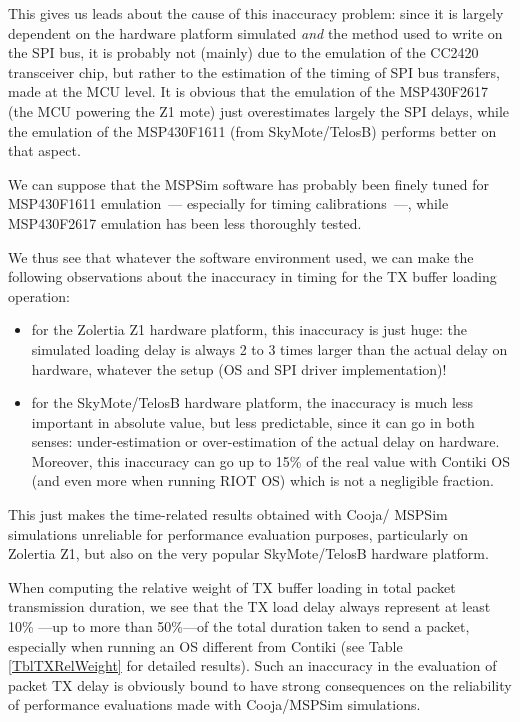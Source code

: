 \documentclass[10pt]{ewsn-proc}
\begin{document}
\medskip

This gives us leads about the cause of this inaccuracy problem: since it
is largely dependent on the hardware platform simulated \emph{and} the method
used to write on the SPI bus, it is probably not (mainly) due to the
emulation of the CC2420 transceiver chip, but rather to the estimation of
the timing of SPI bus transfers, made at the MCU level. It is obvious that
the emulation of the MSP430F2617 (the MCU powering the Z1 mote) just
overestimates largely the SPI delays, while the emulation of the MSP430F1611
(from SkyMote/TelosB) performs better on that aspect.

We can suppose that the MSPSim software has probably been finely tuned for
MSP430F1611 emulation~--- especially for timing calibrations~---, while
MSP430F2617 emulation has been less thoroughly tested.

\medskip

We thus see that whatever the software environment used, we can make the
following observations about the inaccuracy in timing for the TX buffer
loading operation:
\begin{itemize}
\item for the Zolertia Z1 hardware platform, this inaccuracy is just huge:
the simulated loading delay is always 2 to 3 times larger than the actual
delay on hardware, whatever the setup (OS and SPI driver implementation)!
\item for the SkyMote/TelosB hardware platform, the inaccuracy is much less
important in absolute value, but less predictable, since it can go in both
senses: under-estimation or over-estimation of the actual delay on hardware.
Moreover, this inaccuracy can go up to 15\% of the real value with Contiki
OS (and even more when running RIOT OS) which is not a negligible fraction.
\end{itemize}

\bigskip

This just makes the time-related results obtained with Cooja/ MSPSim
simulations unreliable for performance evaluation purposes, particularly
on Zolertia Z1, but also on the very popular SkyMote/TelosB hardware platform.

\medskip

When computing the relative weight of TX buffer loading in total packet
transmission duration, we see that the TX load delay always represent at
least 10\% ---up to more than 50\%---of the total duration taken to send
a packet, especially when running an OS different from Contiki (see Table
\ref{TblTXRelWeight} for detailed results).
Such an inaccuracy in the evaluation of packet TX delay is obviously bound
to have strong consequences on the reliability of performance evaluations
made with Cooja/MSPSim simulations.
\end{document}
